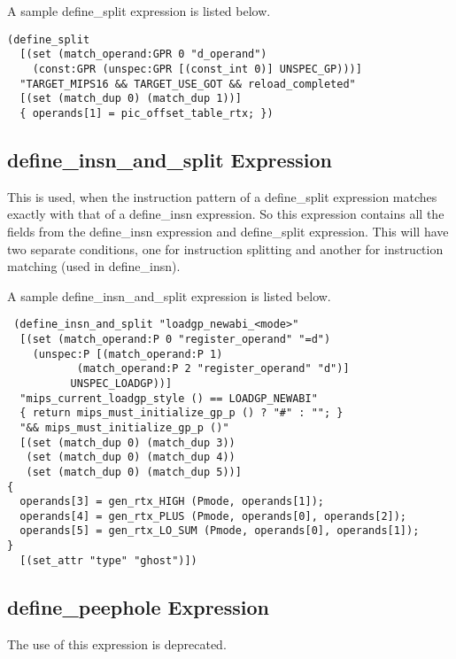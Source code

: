 A sample define\_split expression is listed below.

\begin{example}
\onehalfspacing
 \begin{verbatim}
(define_split
  [(set (match_operand:GPR 0 "d_operand")
	(const:GPR (unspec:GPR [(const_int 0)] UNSPEC_GP)))]
  "TARGET_MIPS16 && TARGET_USE_GOT && reload_completed"
  [(set (match_dup 0) (match_dup 1))]
  { operands[1] = pic_offset_table_rtx; })  
 \end{verbatim}
\end{example}


\subsection{define\_insn\_and\_split Expression}
This is used, when the instruction pattern of a define\_split expression matches exactly with that of a define\_insn expression. So this expression
contains all the fields from the define\_insn expression and define\_split expression. This will have two separate conditions, one for instruction
splitting and another for instruction matching (used in define\_insn).

A sample define\_insn\_and\_split expression is listed below.

\begin{example}
\onehalfspacing
\begin{verbatim}
 (define_insn_and_split "loadgp_newabi_<mode>"
  [(set (match_operand:P 0 "register_operand" "=d")
	(unspec:P [(match_operand:P 1)
		   (match_operand:P 2 "register_operand" "d")]
		  UNSPEC_LOADGP))]
  "mips_current_loadgp_style () == LOADGP_NEWABI"
  { return mips_must_initialize_gp_p () ? "#" : ""; }
  "&& mips_must_initialize_gp_p ()"
  [(set (match_dup 0) (match_dup 3))
   (set (match_dup 0) (match_dup 4))
   (set (match_dup 0) (match_dup 5))]
{
  operands[3] = gen_rtx_HIGH (Pmode, operands[1]);
  operands[4] = gen_rtx_PLUS (Pmode, operands[0], operands[2]);
  operands[5] = gen_rtx_LO_SUM (Pmode, operands[0], operands[1]);
}
  [(set_attr "type" "ghost")])
\end{verbatim}
 
\end{example}


\subsection{define\_peephole Expression}
The use of this expression is deprecated.

